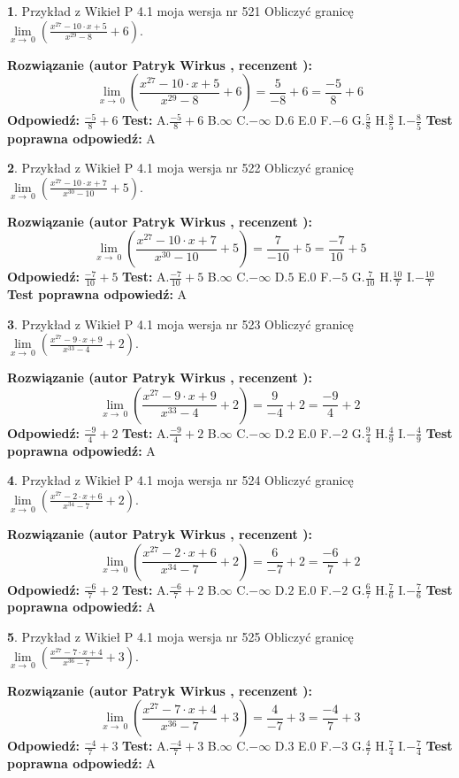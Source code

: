 \documentclass[12pt, a4paper]{article}
\theoremstyle{definition} %
\newtheorem{zad}{}
\newcommand{\zadStart}[1]{\begin{zad}#1\newline}
\newcommand{\zadStop}{\end{zad}}
\newcommand{\rozwStart}[2]{\noindent \textbf{Rozwiązanie (autor #1 , recenzent #2): }\newline}
\newcommand{\rozwStop}{\newline}
\newcommand{\odpStart}{\noindent \textbf{Odpowiedź:}\newline}
\newcommand{\odpStop}{\newline}
\newcommand{\testStart}{\noindent \textbf{Test:}\newline}
\newcommand{\testStop}{\newline}
\newcommand{\kluczStart}{\noindent \textbf{Test poprawna odpowiedź:}\newline}
\newcommand{\kluczStop}{\newline}
\begin{document}
\zadStart{Przykład z Wikieł P 4.1 moja wersja nr 521}
Obliczyć granicę $\lim\limits_{x\to\ 0}(\frac{x^{27}-10 \cdot x +5}{x^{29}-8}+6)$.
\zadStop
\rozwStart{Patryk Wirkus}{}
$$\lim\limits_{x\to\ 0}(\frac{x^{27}-10 \cdot x +5}{x^{29}-8}+6)=\frac{5}{-8}+6=\frac{-5}{8}+6$$
\rozwStop
\odpStart
$\frac{-5}{8}+6$
\odpStop
\testStart
A.$\frac{-5}{8}+6$
B.$\infty$
C.$-\infty$
D.$6$
E.$0$
F.$-6$
G.$\frac{5}{8}$
H.$\frac{8}{5}$
I.$-\frac{8}{5}$
\testStop
\kluczStart
A
\kluczStop



\zadStart{Przykład z Wikieł P 4.1 moja wersja nr 522}
Obliczyć granicę $\lim\limits_{x\to\ 0}(\frac{x^{27}-10 \cdot x +7}{x^{30}-10}+5)$.
\zadStop
\rozwStart{Patryk Wirkus}{}
$$\lim\limits_{x\to\ 0}(\frac{x^{27}-10 \cdot x +7}{x^{30}-10}+5)=\frac{7}{-10}+5=\frac{-7}{10}+5$$
\rozwStop
\odpStart
$\frac{-7}{10}+5$
\odpStop
\testStart
A.$\frac{-7}{10}+5$
B.$\infty$
C.$-\infty$
D.$5$
E.$0$
F.$-5$
G.$\frac{7}{10}$
H.$\frac{10}{7}$
I.$-\frac{10}{7}$
\testStop
\kluczStart
A
\kluczStop



\zadStart{Przykład z Wikieł P 4.1 moja wersja nr 523}
Obliczyć granicę $\lim\limits_{x\to\ 0}(\frac{x^{27}-9 \cdot x +9}{x^{33}-4}+2)$.
\zadStop
\rozwStart{Patryk Wirkus}{}
$$\lim\limits_{x\to\ 0}(\frac{x^{27}-9 \cdot x +9}{x^{33}-4}+2)=\frac{9}{-4}+2=\frac{-9}{4}+2$$
\rozwStop
\odpStart
$\frac{-9}{4}+2$
\odpStop
\testStart
A.$\frac{-9}{4}+2$
B.$\infty$
C.$-\infty$
D.$2$
E.$0$
F.$-2$
G.$\frac{9}{4}$
H.$\frac{4}{9}$
I.$-\frac{4}{9}$
\testStop
\kluczStart
A
\kluczStop



\zadStart{Przykład z Wikieł P 4.1 moja wersja nr 524}
Obliczyć granicę $\lim\limits_{x\to\ 0}(\frac{x^{27}-2 \cdot x +6}{x^{34}-7}+2)$.
\zadStop
\rozwStart{Patryk Wirkus}{}
$$\lim\limits_{x\to\ 0}(\frac{x^{27}-2 \cdot x +6}{x^{34}-7}+2)=\frac{6}{-7}+2=\frac{-6}{7}+2$$
\rozwStop
\odpStart
$\frac{-6}{7}+2$
\odpStop
\testStart
A.$\frac{-6}{7}+2$
B.$\infty$
C.$-\infty$
D.$2$
E.$0$
F.$-2$
G.$\frac{6}{7}$
H.$\frac{7}{6}$
I.$-\frac{7}{6}$
\testStop
\kluczStart
A
\kluczStop



\zadStart{Przykład z Wikieł P 4.1 moja wersja nr 525}
Obliczyć granicę $\lim\limits_{x\to\ 0}(\frac{x^{27}-7 \cdot x +4}{x^{36}-7}+3)$.
\zadStop
\rozwStart{Patryk Wirkus}{}
$$\lim\limits_{x\to\ 0}(\frac{x^{27}-7 \cdot x +4}{x^{36}-7}+3)=\frac{4}{-7}+3=\frac{-4}{7}+3$$
\rozwStop
\odpStart
$\frac{-4}{7}+3$
\odpStop
\testStart
A.$\frac{-4}{7}+3$
B.$\infty$
C.$-\infty$
D.$3$
E.$0$
F.$-3$
G.$\frac{4}{7}$
H.$\frac{7}{4}$
I.$-\frac{7}{4}$
\testStop
\kluczStart
A
\kluczStop
\end{document}

